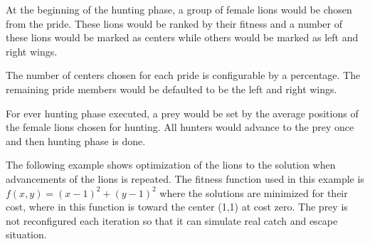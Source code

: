 At the beginning of the hunting phase, a group of female lions would be chosen from the pride. These lions would be ranked by their fitness and a number of these lions would be marked as centers while others would be marked as left and right wings.

The number of centers chosen for each pride is configurable by a percentage. The remaining pride members would be defaulted to be the left and right wings.

For ever hunting phase executed, a prey would be set by the average positions of the female lions chosen for hunting. All hunters would advance to the prey once and then hunting phase is done.

The following example shows optimization of the lions to the solution when advancements of the lions is repeated. The fitness function used in this example is $f(x,y) = (x-1)^2 + (y-1)^2$ where the solutions are minimized for their cost, where in this function is toward the center (1,1) at cost zero. The prey is not reconfigured each iteration so that it can simulate real catch and escape situation.

